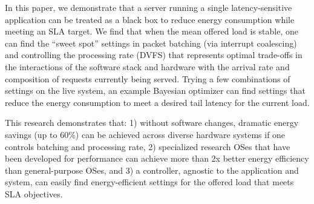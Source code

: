 
In this paper, we demonstrate that a server running a single latency-sensitive application can be treated as a black box to reduce energy consumption while meeting an SLA target. We find that when the mean offered load is stable, one can find the ``sweet spot'' settings in packet batching (via interrupt coalescing) and controlling the processing rate (DVFS) that represents optimal trade-offs in the interactions of the software stack and hardware with the arrival rate and composition of requests currently being served. Trying a few combinations of settings on the live system, an example Bayesian optimizer can find settings that reduce the energy consumption to meet a desired tail latency for the current load.

This research demonstrates that: 1) without software changes, dramatic energy savings (up to 60\%) can be achieved across diverse hardware systems if one controls batching and processing rate, 2) specialized research OSes that have been developed for performance can achieve more than 2x better energy efficiency than general-purpose OSes, and 3) a controller, agnostic to the application and system, can easily find energy-efficient settings for the offered load that meets SLA objectives.